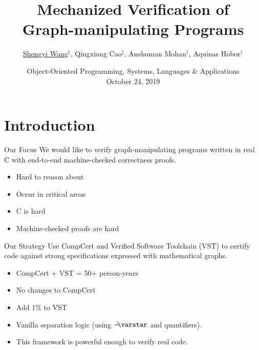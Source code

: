 \documentclass[professionalfonts, xcolor=table]{beamer}
\title[Mechanized Verification]{Mechanized Verification of \\
  Graph-manipulating Programs}
\author[Wang, Cao, Mohan, Hobor]{\hspace{-0.5em}\underline{Shengyi Wang}$^{\dagger}$,
  Qingxiang Cao$^{\ddagger}$, Anshuman Mohan$^{\dagger}$, Aquinas Hobor$^{\dagger}$
  \hspace*{-0.5em}}
\institute[NUS]{$\texttt{[image: NUS\_logo\_full-horizontal.jpg]}
  ~\raisebox{2em}{$(\dagger)$}$
  $\qquad \qquad \qquad$ $\texttt{[image: sjtubannerblue.png]}~
  ~\raisebox{2em}{$(\ddagger)$}$ \hspace*{-1.25em}}
\date[OOPSLA 2019]{Object-Oriented Programming, Systems, Languages \& Applications \\
  October 24, 2019}
\newcommand{\scon}{\mathbin{\varstar}}
\newcommand{\wand}{%
 \mathrel{\mbox{$\hspace*{-0.03em}\mathord{-}\hspace*{-0.66em}
  \mathord{-}\hspace*{-0.36em}\mathord{\scon}$\hspace*{-0.005em}}}}
\begin{document}
\begin{frame}
  \titlepage
\end{frame}

\section{Introduction}

\begin{frame}{Our Focus}
We would like to verify \alert{graph-manipulating} programs written in \alert{real C}
with end-to-end \alert{machine-checked} correctness proofs.
\begin{itemize}
\item Hard to reason about
\item Occur in critical areas
\item C is hard
\item Machine-checked proofs are hard
\end{itemize}
\end{frame}

\begin{frame}{Our Strategy}
Use \alert{CompCert} and \alert{Verified Software Toolchain} (VST) to certify  code against strong specifications expressed with \alert{mathematical graphs}.
\begin{itemize}
\item CompCert + VST = 50+ person-years
\item No changes to CompCert
\item Add 1\% to VST
\item Vanilla separation logic (using $\wand$ and quantifiers).
\item This framework is \alert{powerful enough to verify real code}.
\end{itemize}
\end{frame}
\end{document}
